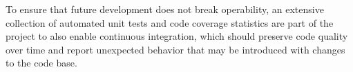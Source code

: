 To ensure that future development does not break operability, an extensive collection of automated unit tests and code coverage statistics are part of the project to also enable continuous integration, which should preserve code quality over time and report unexpected behavior that may be introduced with changes to the code base.


